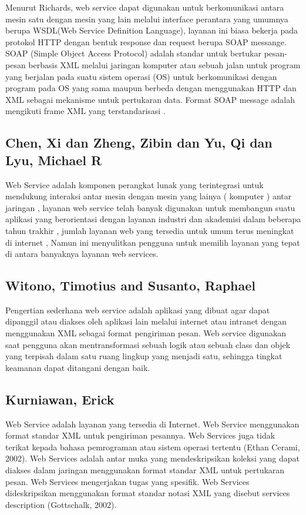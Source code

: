 \documentclass[12pt]{article}
\begin{document}
Menurut Richards, web service dapat digunakan untuk berkomunikasi antara mesin satu dengan mesin yang lain melalui interface perantara yang umumnya berupa WSDL(Web Service Definition Language), layanan ini biasa bekerja pada protokol HTTP dengan bentuk response dan request berupa SOAP messange. SOAP (Simple Object Access Protocol) adalah standar untuk bertukar pesan-pesan berbasis XML melalui jaringan komputer atau sebuah jalan untuk program yang berjalan pada suatu sistem operasi (OS) untuk berkomunikasi dengan program pada OS yang sama maupun berbeda dengan menggunakan HTTP dan XML sebagai mekanisme untuk pertukaran data. Format SOAP message adalah mengikuti frame XML yang terstandarisasi \cite{ihya2011pembuatan}. 

\subsection{Chen, Xi dan Zheng, Zibin dan Yu, Qi dan Lyu, Michael R}

Web Service adalah komponen perangkat lunak yang terintegrasi untuk mendukung interaksi antar mesin dengan mesin yang lainya ( komputer ) antar jaringan , layanan web service telah banyak digunakan untuk membangun suatu aplikasi yang berorientasi dengan layanan industri dan akademisi dalam beberapa tahun trakhir , jumlah layanan web yang tersedia untuk umum terus meningkat di internet , Namun  ini menyulitkan pengguna untuk memilih layanan yang tepat di antara banyaknya layanan web services\cite{chen2014web}.

\subsection{Witono, Timotius and Susanto, Raphael}

Pengertian sederhana web service adalah aplikasi yang dibuat agar dapat dipanggil atau diakses oleh aplikasi lain melalui internet atau intranet dengan menggunakan XML sebagai format pengiriman pesan. Web service digunakan saat pengguna akan mentransformasi sebuah logik atau sebuah class dan objek yang terpisah dalam satu ruang lingkup yang menjadi satu, sehingga tingkat keamanan dapat ditangani dengan baik\cite{witono201511}.

\subsection{Kurniawan, Erick}

Web Service adalah layanan yang tersedia di Internet. Web Service menggunakan format standar XML untuk pengiriman pesannya. Web Services juga tidak terikat kepada bahasa pemrograman atau sistem operasi tertentu (Ethan Cerami, 2002). Web Services adalah antar muka yang mendeskripsikan koleksi yang dapat diakses dalam jaringan menggunakan format standar XML untuk pertukaran pesan. Web Services mengerjakan tugas yang spesifik. Web Services dideskripsikan menggunakan format standar notasi XML yang disebut services description (Gottschalk, 2002)\cite{chen2014web}.
\end{document}
